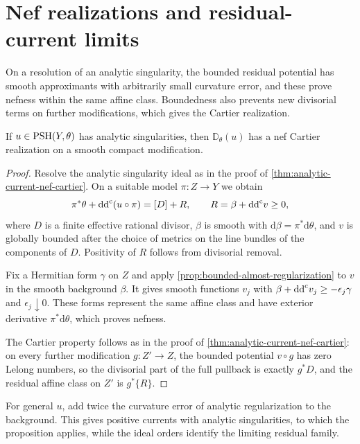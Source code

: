 \section{Nef realizations and residual-current limits}\label{sec:nonclosed-nef-approximation}

On a resolution of an analytic singularity, the bounded residual potential has smooth approximants with arbitrarily small curvature error, and these prove nefness within the same affine class. Boundedness also prevents new divisorial terms on further modifications, which gives the Cartier realization.

\begin{proposition}\label{prop:nonclosed-analytic-nef-cartier}
If $u\in\mathrm{PSH}(Y,\theta)$ has analytic singularities, then $\mathbb D_\theta(u)$ has a nef Cartier realization on a smooth compact modification.
\end{proposition}
\begin{proof}
Resolve the analytic singularity ideal as in the proof of \cref{thm:analytic-current-nef-cartier}. On a suitable model $\pi\colon Z\to Y$ we obtain
\[
 \pi^*\theta+\mathrm{dd}^{\mathrm{c}}(u\circ\pi)=[D]+R,
 \qquad R=\beta+\mathrm{dd}^{\mathrm{c}} v\geq0,
\]
where $D$ is a finite effective rational divisor, $\beta$ is smooth with $\mathrm{d}\beta=\pi^*\mathrm{d}\theta$, and $v$ is globally bounded after the choice of metrics on the line bundles of the components of $D$. Positivity of $R$ follows from divisorial removal.

Fix a Hermitian form $\gamma$ on $Z$ and apply \cref{prop:bounded-almost-regularization} to $v$ in the smooth background $\beta$. It gives smooth functions $v_j$ with $\beta+\mathrm{dd}^{\mathrm{c}} v_j\geq-\epsilon_j\gamma$ and $\epsilon_j\downarrow0$. These forms represent the same affine class and have exterior derivative $\pi^*\mathrm{d}\theta$, which proves nefness.

The Cartier property follows as in the proof of \cref{thm:analytic-current-nef-cartier}: on every further modification $g\colon Z'\to Z$, the bounded potential $v\circ g$ has zero Lelong numbers, so the divisorial part of the full pullback is exactly $g^*D$, and the residual affine class on $Z'$ is $g^*\{R\}$.
\end{proof}

For general $u$, add twice the curvature error of analytic regularization to the background. This gives positive currents with analytic singularities, to which the proposition applies, while the ideal orders identify the limiting residual family.

